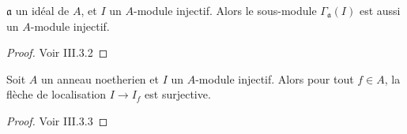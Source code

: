 \begin{cor}\label{cohomAffLemme1}
$\mathfrak{a}$ un idéal de $A$, et $I$ un $A$-module injectif. Alors le sous-module $\Gamma_\mathfrak{a}(I)$ est aussi un $A$-module injectif.
\end{cor}
\begin{proof}
Voir \cite{Hartshorne} III.3.2
\end{proof}

\begin{lem}
Soit $A$ un anneau noetherien et $I$ un $A$-module injectif. Alors pour tout $f\in A$, la flèche de localisation $I\rightarrow I_f$ est surjective.
\end{lem}
\begin{proof}
Voir \cite{Hartshorne} III.3.3
\end{proof}

